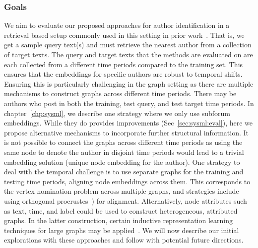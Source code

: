 \subsubsection{Goals}
We aim to evaluate our proposed approaches for author identification in a retrieval based setup commonly used in this setting in prior work~\cite{andrews2019learning,riverastao2021learning,khan2021deep,maneriker2021sysml}.
That is, we get a sample query text(s) and must retrieve the nearest author from a collection of target texts.
The query and target texts that the methods are evaluated on are each collected from a different time periods compared to the training set.
This ensures that the embeddings for specific authors are robust to temporal shifts.
Ensuring this is particularly challenging in the graph setting as there are multiple mechanisms to construct graphs across different time periods.
There may be authors who post in both the training, test query, and test target time periods.
In chapter~\ref{chp:sysml}, we describe one strategy where we only use subforum embeddings.
While they do provides improvements (Sec~\ref{sec:sysml:eval}), here we propose alternative mechanisms to incorporate further structural information.
It is not possible to connect the graphs across different time periods as using the same node to denote the author in disjoint time periods would lead to a trivial embedding solution (unique node embedding for the author).
One strategy to deal with the temporal challenge is to use separate graphs for the training and testing time periods, aligning node embeddings across them.
This corresponds to the vertex nomination problem across multiple graphs, and strategies include using orthogonal procrustes~\cite{agterberg2020vertex}) for alignment.
Alternatively, node attributes such as text, time, and label could be used to construct heterogeneous, attributed graphs.
In the latter construction, certain inductive representation learning techniques for large graphs may be applied~\cite{hamilton2017inductive,xu2020inductive}.
We will now describe our initial explorations with these approaches and follow with potential future directions.

